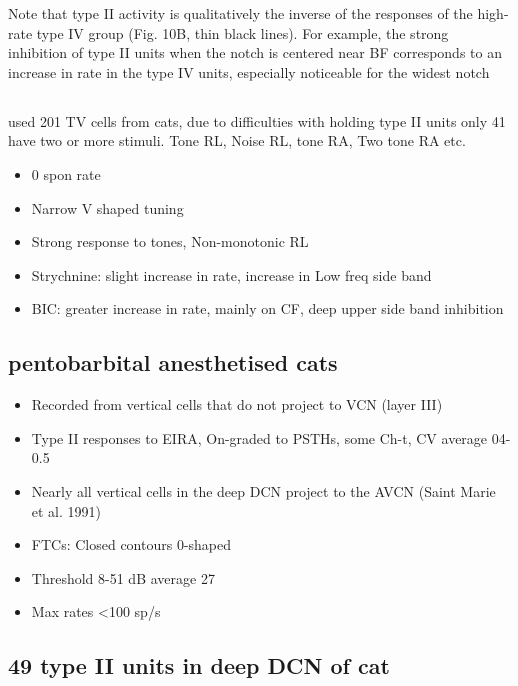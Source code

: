 \documentclass[10pt,a4paper]{article}
\begin{document}
Note that type II activity is qualitatively the inverse of the responses of the
high-rate type IV group (Fig. 10B, thin black lines). For example, the strong
inhibition of type II units when the notch is centered near BF corresponds to an
increase in rate in the type IV units, especially noticeable for the widest
notch


\subsection{\citep{SpirouDavisEtAl:1999}}
used 201 TV cells from cats, due to difficulties
with holding type II units only 41 have two or more stimuli.  Tone RL, Noise RL,
tone RA, Two tone RA etc.


\begin{itemize}
\item 0 spon rate
\item Narrow V shaped tuning
\item Strong response to tones, Non-monotonic RL
\item Strychnine: slight increase in rate, increase in Low freq side band
\item BIC: greater increase in rate, mainly on CF, deep upper side band
  inhibition
\end{itemize}

\subsection{\citep{Rhode:1999} pentobarbital anesthetised cats}


\begin{itemize}
\item Recorded from vertical cells that do not project to VCN (layer III)
\item Type II responses to EIRA, On-graded to PSTHs, some Ch-t, CV average
  04-0.5
\item Nearly all vertical cells in the deep DCN project to the AVCN (Saint Marie
  et al. 1991)
\item FTCs: Closed contours 0-shaped
\item Threshold 8-51 dB average 27
\item Max rates {\textless}100 sp/s
\end{itemize}

\subsection{\citep{YoungVoigt:1982} 49 type II units in deep DCN of cat}
\end{document}
